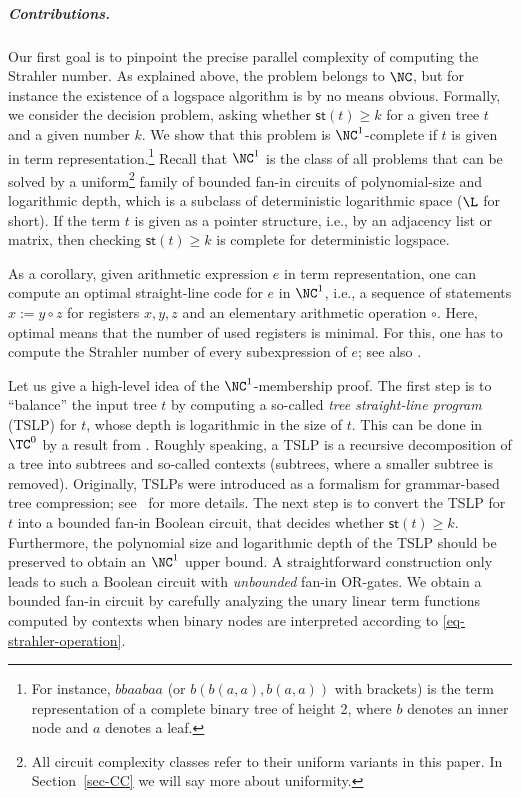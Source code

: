 \documentclass[a4paper,UKenglish,cleveref, autoref, thm-restate, numberwithinsect]{lipics-v2021}
\newcommand{\hs}{\mathsf{st}}
\begin{document}
\subparagraph{Contributions.}
Our first goal is to pinpoint the precise parallel complexity of computing the Strahler number. 
As explained above, the problem belongs to $\NC$, but for instance the existence
of a logspace algorithm is by no means obvious. Formally, we 
consider the decision problem,
asking whether $\hs(t) \geq k$ for a given tree $t$ and a given number $k$. 
We show that this problem is $\NC^1$-complete
if $t$ is given in term representation.\footnote{For instance, $bbaabaa$ (or $b(b(a,a),b(a,a))$ with brackets)
is the term representation of a complete binary tree of height 2, where $b$ denotes an inner node and $a$ denotes a leaf.}
Recall that $\NC^1$ is the class of all problems that can be solved by a uniform\footnote{All circuit complexity classes refer to their uniform variants in this paper. In Section~\ref{sec-CC} we will say more about uniformity.} family of bounded fan-in circuits of polynomial-size and logarithmic depth,
which is a subclass of deterministic logarithmic space ($\L$ for short).
If the term $t$ is given as a pointer structure, i.e., by an adjacency list or matrix, then checking $\hs(t) \geq k$ 
is complete for deterministic logspace.

As a corollary, given arithmetic expression $e$ in term representation,
one can compute an optimal straight-line code for $e$ in $\NC^1$,
i.e., a sequence of statements $x := y \circ z$ for registers $x,y,z$ and an elementary arithmetic operation $\circ$.
Here, optimal means that the number of used registers is minimal.
For this, one has to compute the Strahler number of every subexpression of $e$; see also \cite[Section~2]{EsparzaLS14}.

Let us give a high-level idea of the $\NC^1$-membership proof.
The first step is to ``balance'' the input tree $t$
by computing a so-called \emph{tree straight-line program} (TSLP) for $t$, whose depth is 
logarithmic in the size of $t$.
This can be done in $\TC^0$ by a result from \cite{GanardiL19}.  Roughly speaking, 
a TSLP is a recursive decomposition of a tree into subtrees
and so-called contexts (subtrees, where a smaller subtree is removed). Originally, TSLPs
were introduced as a formalism for grammar-based tree compression; see~\cite{Lohrey15} for more details.
The next step is to convert the TSLP for $t$ into a bounded fan-in Boolean circuit, that decides whether $\hs(t) \geq k$. 
Furthermore, the polynomial size and logarithmic depth of the TSLP should be preserved to obtain an $\NC^1$ upper bound.
A straightforward construction only leads to such a Boolean circuit with \emph{unbounded} fan-in OR-gates.
We obtain a bounded fan-in circuit by carefully analyzing 
the unary linear term functions computed by contexts when binary nodes are interpreted according to \eqref{eq-strahler-operation}.
\end{document}
